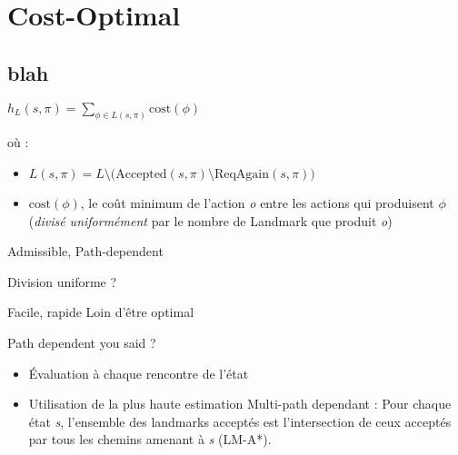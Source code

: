 \section{Cost-Optimal}
  \subsection*{blah}

\begin{frame}
  \begin{block}{}
     
  \end{block}

  \begin{block}{}
      \begin{center}
        $h_L(s, \pi) = \sum_{\phi \in L(s, \pi)} \text{cost}(\phi)$
      \end{center}
      
      où :
    \begin{itemize}
      \item $L(s, \pi) = L \setminus \big(\text{Accepted}(s, \pi) \setminus \text{ReqAgain}(s, \pi)\big)$
      \item $\text{cost}(\phi)$, le coût minimum de l'action \emph{o} entre les actions qui produisent $\phi$ (\emph{divisé uniformément} par le nombre de Landmark que produit \emph{o})
    \end{itemize}
    \alert{Admissible, Path-dependent}
  \end{block}
  
  \begin{block}{Division uniforme ?}
    \begin{itemize}
      \proitem Facile, rapide
      \conitem Loin d'être optimal
    \end{itemize}
  \end{block}
\end{frame}

\begin{frame}
  \begin{block}{Path dependent you said ?}
    \begin{itemize}
      \item Évaluation à chaque rencontre de l'état
      \item Utilisation de la plus haute estimation
      \thusitem Multi-path dependant : Pour chaque état \emph{s}, l'ensemble des landmarks acceptés est l'intersection de ceux acceptés par tous les chemins amenant à \emph{s} (LM-A*).
    \end{itemize}
  \end{block}
\end{frame}
  
